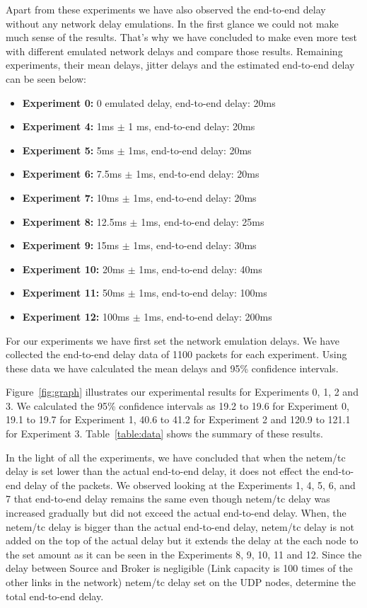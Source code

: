 \documentclass[conference]{IEEEtran}
\begin{document}
Apart from these experiments we have also observed the end-to-end delay without any network delay emulations. In the first glance we could not make much sense of the results. That's why we have concluded to  make even more test with different emulated network delays and compare those results. Remaining experiments, their mean delays, jitter delays and the estimated end-to-end delay can be seen below:

\begin{itemize}
    \item \textbf{Experiment 0:} 0 emulated delay, end-to-end delay: 20ms
    \item \textbf{Experiment 4:} 1ms $\pm$ 1 ms, end-to-end delay: 20ms
    \item \textbf{Experiment 5:} 5ms $\pm$ 1ms, end-to-end delay: 20ms
    \item \textbf{Experiment 6:} 7.5ms $\pm$ 1ms, end-to-end delay: 20ms
    \item \textbf{Experiment 7:} 10ms $\pm$ 1ms, end-to-end delay: 20ms
    \item \textbf{Experiment 8:} 12.5ms $\pm$ 1ms, end-to-end delay: 25ms
    \item \textbf{Experiment 9:} 15ms $\pm$ 1ms, end-to-end delay: 30ms
    \item \textbf{Experiment 10:} 20ms $\pm$ 1ms, end-to-end delay: 40ms
    \item \textbf{Experiment 11:} 50ms $\pm$ 1ms, end-to-end delay: 100ms
    \item \textbf{Experiment 12:} 100ms $\pm$ 1ms, end-to-end delay: 200ms
\end{itemize}

For our experiments we have first set the network emulation delays. We have collected the end-to-end delay data of 1100 packets for each experiment. Using these data we have calculated the mean delays and 95\% confidence intervals.

Figure~\ref{fig:graph} illustrates our experimental results for Experiments 0, 1, 2 and 3.
We calculated the 95\% confidence intervals as 19.2 to 19.6 for Experiment 0,
19.1 to 19.7 for Experiment 1, 40.6 to 41.2 for Experiment 2 and 120.9 to 121.1
for Experiment 3. Table~\ref{table:data} shows the summary of these results.

In the light of all the experiments, we have concluded that when the netem/tc delay is set lower than the actual end-to-end delay, it does not effect the end-to-end delay of the packets. We observed looking at the Experiments 1, 4, 5, 6, and 7 that end-to-end delay remains the same even though netem/tc delay was increased gradually but did not exceed the actual end-to-end delay. When, the netem/tc delay is bigger than the actual end-to-end delay, netem/tc delay is not added on the top of the actual delay but it extends the delay at the each node to the set amount as it can be seen in the Experiments 8, 9, 10, 11 and 12. Since the delay between Source and Broker is negligible (Link capacity is 100 times of the other links in the network) netem/tc delay set on the UDP nodes, determine the total end-to-end delay.
\end{document}
